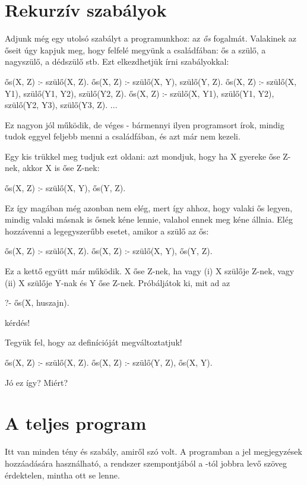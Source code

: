 \section{Rekurzív szabályok}

Adjunk még egy utolsó szabályt a programunkhoz: az \emph{ős} fogalmát. Valakinek az őseit úgy kapjuk meg, hogy felfelé megyünk a családfában: ős a szülő, a nagyszülő, a dédszülő stb. Ezt elkezdhetjük írni szabályokkal:
\begin{program}
ős(X, Z) :- szülő(X, Z).
ős(X, Z) :- szülő(X, Y), szülő(Y, Z).
ős(X, Z) :- szülő(X, Y1), szülő(Y1, Y2), szülő(Y2, Z).
ős(X, Z) :- szülő(X, Y1), szülő(Y1, Y2), szülő(Y2, Y3), szülő(Y3, Z).
...
\end{program}
Ez nagyon jól működik, de véges - bármennyi ilyen programsort írok, mindig tudok eggyel feljebb menni a családfában, és azt már nem kezeli.

Egy kis trükkel meg tudjuk ezt oldani: azt mondjuk, hogy ha X gyereke őse Z-nek, akkor X is őse Z-nek:
\begin{program}
ős(X, Z) :- szülő(X, Y), ős(Y, Z).
\end{program}
Ez így magában még azonban nem elég, mert így ahhoz, hogy valaki ős legyen, mindig valaki másnak is ősnek kéne lennie, valahol ennek meg kéne állnia. Elég hozzávenni a legegyszerűbb esetet, amikor a szülő az ős:
\begin{program}
ős(X, Z) :- szülő(X, Z).
ős(X, Z) :- szülő(X, Y), ős(Y, Z).
\end{program}
Ez a kettő együtt már működik. X őse Z-nek, ha vagy (i) X szülője Z-nek, vagy (ii) X szülője Y-nak és Y őse Z-nek. Próbáljátok ki, mit ad az
\begin{query}
?- ős(X, huszajn).
\end{query}
kérdés!

\begin{problem}
Tegyük fel, hogy az  definícióját megváltoztatjuk!
\begin{program}
ős(X, Z) :- szülő(X, Z).
ős(X, Z) :- szülő(Y, Z), ős(X, Y).
\end{program}
Jó ez így? Miért?
\end{problem}

\section*{A teljes program}

Itt van minden tény és szabály, amiről szó volt. A
programban a \pr{\%} jel megjegyzések hozzáadására
használható, a rendszer szempontjából a \pr{\%}-tól
jobbra levő szöveg érdektelen, mintha ott se
lenne.

